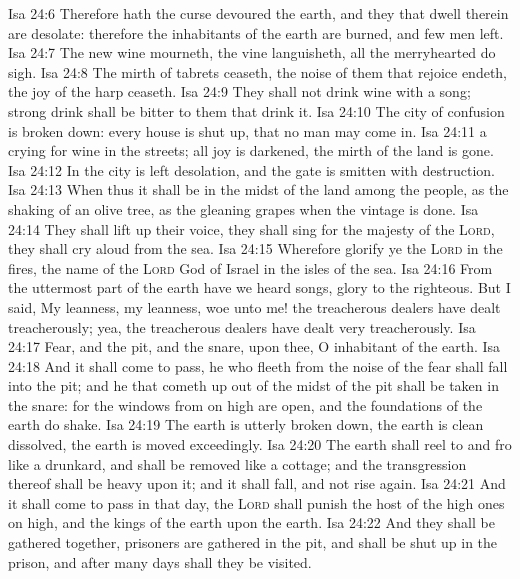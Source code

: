 \vs Isa 24:6 Therefore hath the curse devoured the earth, and they that dwell therein are desolate: therefore the inhabitants of the earth are burned, and few men left.
\vs Isa 24:7 The new wine mourneth, the vine languisheth, all the merryhearted do sigh.
\vs Isa 24:8 The mirth of tabrets ceaseth, the noise of them that rejoice endeth, the joy of the harp ceaseth.
\vs Isa 24:9 They shall not drink wine with a song; strong drink shall be bitter to them that drink it.
\vs Isa 24:10 The city of confusion is broken down: every house is shut up, that no man may come in.
\vs Isa 24:11  a crying for wine in the streets; all joy is darkened, the mirth of the land is gone.
\vs Isa 24:12 In the city is left desolation, and the gate is smitten with destruction.
\vs Isa 24:13 When thus it shall be in the midst of the land among the people,  as the shaking of an olive tree,  as the gleaning grapes when the vintage is done.
\vs Isa 24:14 They shall lift up their voice, they shall sing for the majesty of the \textsc{Lord}, they shall cry aloud from the sea.
\vs Isa 24:15 Wherefore glorify ye the \textsc{Lord} in the fires,  the name of the \textsc{Lord} God of Israel in the isles of the sea.
\vs Isa 24:16 From the uttermost part of the earth have we heard songs,  glory to the righteous. But I said, My leanness, my leanness, woe unto me! the treacherous dealers have dealt treacherously; yea, the treacherous dealers have dealt very treacherously.
\vs Isa 24:17 Fear, and the pit, and the snare,  upon thee, O inhabitant of the earth.
\vs Isa 24:18 And it shall come to pass,  he who fleeth from the noise of the fear shall fall into the pit; and he that cometh up out of the midst of the pit shall be taken in the snare: for the windows from on high are open, and the foundations of the earth do shake.
\vs Isa 24:19 The earth is utterly broken down, the earth is clean dissolved, the earth is moved exceedingly.
\vs Isa 24:20 The earth shall reel to and fro like a drunkard, and shall be removed like a cottage; and the transgression thereof shall be heavy upon it; and it shall fall, and not rise again.
\vs Isa 24:21 And it shall come to pass in that day,  the \textsc{Lord} shall punish the host of the high ones  on high, and the kings of the earth upon the earth.
\vs Isa 24:22 And they shall be gathered together,  prisoners are gathered in the pit, and shall be shut up in the prison, and after many days shall they be visited.
